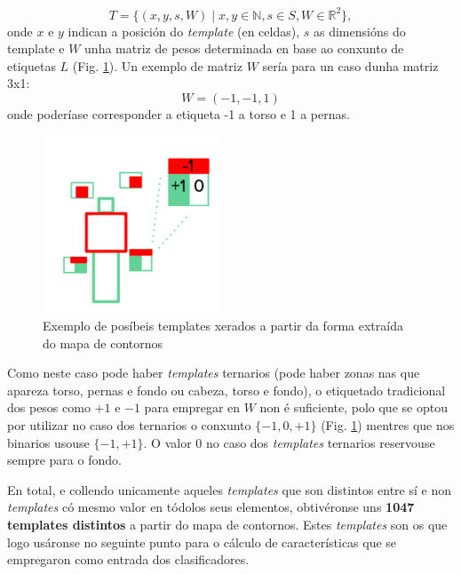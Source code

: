 \documentclass[galician]{./head/uvigo-tfg}
\begin{document}
        \begin{equation}
            T = \{(x,y,s,W) \mid x,y\in \mathbb N , s \in S,W \in \mathbb R^2\},
        \end{equation}
        onde $x$ e $y$ indican a posición do \textit{template} (en celdas), $s$ as dimensións do template e $W$ unha matriz de pesos determinada en base ao conxunto de etiquetas $L$ (Fig. \ref{fig:templates}). Un exemplo de matriz $W$ sería para un caso dunha matriz 3x1:
        \begin{equation}
            W=(-1,-1,1)
        \end{equation} 
        onde poderíase corresponder a etiqueta -1 a torso e 1 a pernas.
        \begin{figure}
            \centering
            \includegraphics[height=200px]{figures/templates_gen.png}
            \caption{Exemplo de posíbeis templates xerados a partir da forma extraída do mapa de contornos}
            \label{fig:templates}
        \end{figure}
        \par Como neste caso pode haber \textit{templates} ternarios (pode haber zonas nas que apareza torso, pernas e fondo ou cabeza, torso e fondo), o etiquetado tradicional dos pesos como $+1$ e $-1$ para empregar en $W$ non é suficiente,  polo que se optou por utilizar no caso dos ternarios o conxunto $\{-1,0,+1\}$ (Fig. \ref{fig:templates}) mentres que nos binarios usouse $\{-1,+1\}$. O valor 0 no caso dos \textit{templates} ternarios reservouse sempre para o fondo.
        \par En total, e collendo unicamente aqueles \textit{templates} que son distintos entre sí e non \textit{templates} có mesmo valor en tódolos seus elementos, obtivéronse uns \textbf{1047 templates distintos} a partir do mapa de contornos. Estes \textit{templates} son os que logo usáronse no seguinte punto para o cálculo de características que se empregaron como entrada dos clasificadores.
        
\end{document}
